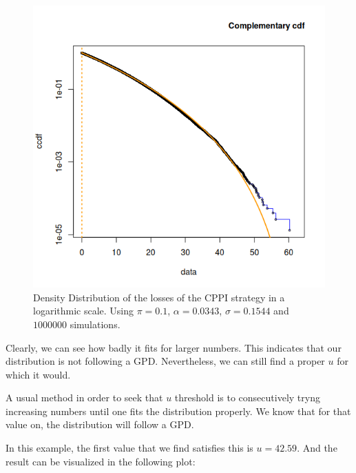 \begin{figure}[H]
    \centering
    \includegraphics[scale=0.75]{images/cppi-ccdf-0.png}
    \caption{Density Distribution of the losses of the CPPI strategy in a logarithmic scale. Using $\pi = 0.1$, $\alpha = 0.0343$, $\sigma = 0.1544$ and $1000000$ simulations.}
    \label{fig:cppi-ccdf-0}
\end{figure}

Clearly, we can see how badly it fits for larger numbers. This indicates that our distribution is not following a GPD. Nevertheless, we can still find a proper $u$ for which it would.

A usual method in order to seek that $u$ threshold is to consecutively tryng increasing numbers until one fits the distribution properly. We know that for that value on, the distribution will follow a GPD.

In this example, the first value that we find satisfies this is $u = 42.59$. And the result can be visualized in the following plot:

